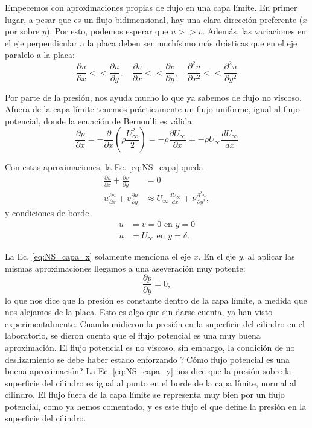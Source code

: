 Empecemos con aproximaciones propias de flujo en una capa límite.
En primer lugar, a pesar que es un flujo bidimensional, hay una clara dirección preferente ($x$ por sobre $y$).
Por esto, podemos esperar que $u>>v$.
Además, las variaciones en el eje perpendicular a la placa deben ser muchísimo más drásticas que en el eje paralelo a la placa:
%
\begin{equation}
\frac{\partial u}{\partial x} << \frac{\partial u}{\partial y}, \quad \frac{\partial v}{\partial x} << \frac{\partial v}{\partial y}, \quad \frac{\partial^2 u}{\partial x^2} << \frac{\partial^2 u}{\partial y^2}
\end{equation}

Por parte de la presión, nos ayuda mucho lo que ya sabemos de flujo no viscoso. 
Afuera de la capa límite tenemos prácticamente un flujo uniforme, igual al flujo potencial, donde la ecuación de Bernoulli es válida:
%
\begin{equation}
\frac{\partial p}{\partial x} = -\frac{\partial}{\partial x}\left(\rho \frac{U_\infty^2}{2}\right) = - \rho\frac{\partial U_\infty}{\partial x} = -\rho U_\infty\frac{dU_\infty}{dx} 
\end{equation}

Con estas aproximaciones, la Ec. \eqref{eq:NS_capa} queda
%
\begin{align}\label{eq:NS_capa_x}
\frac{\partial u}{\partial x} + \frac{\partial v}{\partial y} &= 0 \nonumber\\
u\frac{\partial u}{\partial x} + v\frac{\partial u}{\partial y} &\approx U_\infty \frac{dU_\infty}{dx} + \nu \frac{\partial^2u}{\partial y^2},
\end{align}
%
y condiciones de borde
%
\begin{align}
u &= v = 0 \text{ en } y=0\nonumber\\
u &= U_\infty \text{ en } y=\delta.
\end{align}

La Ec. \eqref{eq:NS_capa_x} solamente menciona el eje $x$.
En el eje $y$, al aplicar las mismas aproximaciones llegamos a una aseveración muy potente:
%
\begin{equation}\label{eq:NS_capa_y}
\frac{\partial p}{\partial y} = 0,
\end{equation}
%
lo que nos dice que la presión es constante dentro de la capa límite, a medida que nos alejamos de la placa.
Esto es algo que sin darse cuenta, ya han visto experimentalmente.
Cuando midieron la presión en la superficie del cilindro en el laboratorio, se dieron cuenta que el flujo potencial es una muy buena aproximación.
El flujo potencial es no viscoso, sin embargo, la condición de no deslizamiento se debe haber estado enforzando \mbox{?`}Cómo flujo potencial es una buena aproximación?
La Ec. \eqref{eq:NS_capa_y} nos dice que la presión sobre la superficie del cilindro es igual al punto en el borde de la capa límite, normal al cilindro. 
El flujo fuera de la capa límite se representa muy bien por un flujo potencial, como ya hemos comentado, y es este flujo el que define la presión en la superficie del cilindro.


